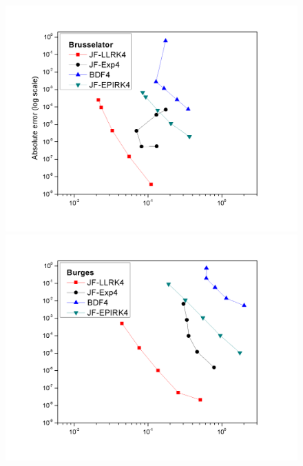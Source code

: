 \documentclass{article}
\title{}
\author{}
\begin{document}
\thispagestyle{empty}
\begin{figure}
	\centering
%	
%	
\vspace{-0.8in}
\begin{minipage}{.5\textwidth}
	\hspace{-0.8in}\includegraphics[scale=0.4]{Graph5.png}
\end{minipage}
\begin{minipage}{.49\textwidth}
	\includegraphics[scale=0.4]{Graph1.png}

\end{minipage}
\end{figure}
\end{document}

